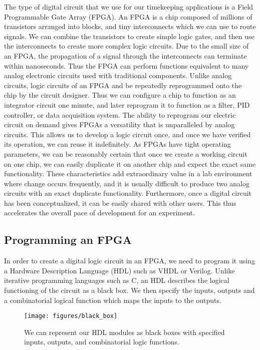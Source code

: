 The type of digital circuit that we use for our timekeeping applications is a
Field Programmable Gate Array  (FPGA).  An FPGA is a chip composed of millions
of transistors arranged into blocks, and tiny interconnects which we can use
to route signals.  We can combine the transistors to create simple logic gates, and then use the interconnects to create more complex logic circuits.  Due to the small size of an FPGA, the propagation of a signal through the interconnects can terminate within nanoseconds.  Thus the FPGA can perform functions equivalent to many analog electronic circuits used with traditional components.
Unlike analog circuits, logic circuits of an FPGA and be repeatedly reprogrammed onto the chip by the circuit designer.  Thus we can configure a chip to function as an integrator circuit one minute, and later reprogram it to function as a filter, PID controller, or data acquisition system.
The ability to reprogram our electric circuit on demand gives FPGAs a
versatility that is unparalleled by analog circuits.  This allows us to
develop a logic circuit once, and once we have verified its operation, we can
reuse it indefinitely.  As FPGAs have tight operating parameters, we can be
reasonably certain that once we create a working circuit on one chip, we can
easily duplicate it on another chip and expect the exact same functionality.
These characteristics add extraordinary value in a lab environment where
change occurs frequently, and it is usually difficult to produce two analog
circuits with an exact duplicate functionality.  Furthermore, once a digital
circuit has been conceptualized, it can be easily shared with other users.
This thus accelerates the overall pace of development for an experiment.

\subsection{Programming an FPGA} 

In order to create a digital logic circuit in an FPGA, we need to program it
using a Hardware Description Language (HDL) such as VHDL or Verilog.  Unlike
iterative programming languages such as C, an HDL describes the logical
functioning of the circuit as a black box.  We then specify the inputs,
outputs and a combinatorial logical function which maps the inputs to the outputs.

\begin{figure}[!ht] 
 \centering 
 \texttt{[image: figures/black\_box]} 
 \caption[Black box representation of HDLs]{We can represent our HDL modules as black boxes with specified inputs, outputs, and combinatorial logic functions.} 
 \label{fig:black_box} 
\end{figure}


